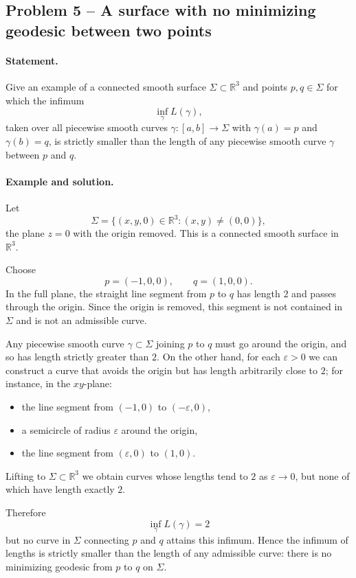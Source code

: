 \documentclass[12pt,a4paper]{article}
\theoremstyle{plain}
\theoremstyle{definition}      %
\begin{document}
	\subsection*{Problem 5 – A surface with no minimizing geodesic between two points}
	
	\paragraph{Statement.}
	Give an example of a connected smooth surface $\Sigma\subset\mathbb{R}^3$
	and points $p,q\in\Sigma$ for which the infimum
	\[
	\inf_\gamma L(\gamma),
	\]
	taken over all piecewise smooth curves $\gamma:[a,b]\to\Sigma$ with
	$\gamma(a)=p$ and $\gamma(b)=q$, is strictly smaller than the length of any
	piecewise smooth curve $\gamma$ between $p$ and $q$.
	
	\paragraph{Example and solution.}
	Let
	\[
	\Sigma = \{(x,y,0)\in\mathbb{R}^3 : (x,y)\neq(0,0)\},
	\]
	the plane $z=0$ with the origin removed.  This is a connected smooth surface
	in $\mathbb{R}^3$.
	
	Choose
	\[
	p=(-1,0,0),\qquad q=(1,0,0).
	\]
	In the full plane, the straight line segment from $p$ to $q$ has length $2$
	and passes through the origin.  Since the origin is removed, this segment is
	not contained in $\Sigma$ and is not an admissible curve.
	
	Any piecewise smooth curve $\gamma\subset\Sigma$ joining $p$ to $q$ must go
	around the origin, and so has length strictly greater than $2$.  On the other
	hand, for each $\varepsilon>0$ we can construct a curve that avoids the origin
	but has length arbitrarily close to $2$; for instance, in the $xy$-plane:
	\begin{itemize}
		\item the line segment from $(-1,0)$ to $(-\varepsilon,0)$,
		\item a semicircle of radius $\varepsilon$ around the origin,
		\item the line segment from $(\varepsilon,0)$ to $(1,0)$.
	\end{itemize}
	Lifting to $\Sigma\subset\mathbb{R}^3$ we obtain curves whose lengths tend to
	$2$ as $\varepsilon\to0$, but none of which have length exactly $2$.
	
	Therefore
	\[
	\inf_\gamma L(\gamma)=2
	\]
	but no curve in $\Sigma$ connecting $p$ and $q$ attains this infimum.  Hence
	the infimum of lengths is strictly smaller than the length of any admissible
	curve: there is no minimizing geodesic from $p$ to $q$ on $\Sigma$.
	
\end{document}

